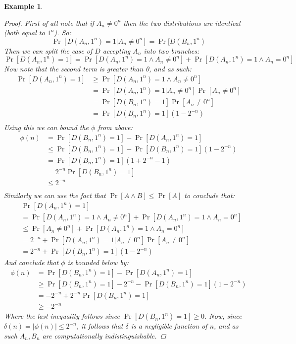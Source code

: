 \documentclass{article}
\newtheorem{example}{Example}
\begin{document}
\begin{example}
\begin{proof}
First of all note that if $A_n \neq 0^n$ then the two distributions are identical (both equal to $1^n$). So:
\[\Pr[D(A_n, 1^n) = 1 | A_n \neq 0^n] = \Pr[D(B_n, 1^n) \]
Then we can split the case of $D$ accepting $A_n$ into two branches:
\[ \Pr[D(A_n, 1^n) = 1] = \Pr[D(A_n, 1^n) = 1 \land A_n \neq 0^n] + \Pr[D(A_n, 1^n) = 1 \land A_n = 0^n]   \]
Now note that the second term is greater than 0, and as such:
\begin{align*}
    \Pr[D(A_n, 1^n) = 1] &\geq \Pr[D(A_n, 1^n) = 1 \land A_n \neq 0^n] \\
    &= \Pr[D(A_n, 1^n) = 1 | A_n \neq 0^n] \Pr[A_n \neq 0^n] \\
    &= \Pr[D(B_n, 1^n) = 1] \Pr[A_n \neq 0^n] \\
    &= \Pr[D(B_n, 1^n) = 1] (1 - 2^{-n}) \\
\end{align*}
Using this we can bound the $\phi$ from above: 
\begin{align*}
 \phi(n) &= \Pr[D(B_n, 1^n) = 1] - \Pr[D(A_n, 1^n) = 1] \\
 &\leq  \Pr[D(B_n, 1^n) = 1] - \Pr[D(B_n, 1^n) = 1] (1 - 2^{-n})  \\
 &= \Pr[D(B_n, 1^n) = 1] (1 + 2^{-n} - 1) \\
 &= 2^{-n} \Pr[D(B_n, 1^n) = 1] \\ 
 &\leq 2^{-n} \\
\end{align*}
Similarly we can use the fact that $\Pr[A \land B] \leq \Pr[A]$ to conclude that:
\begin{align*}
    &\Pr[D(A_n, 1^n) = 1] \\
    &= \Pr[D(A_n, 1^n) = 1 \land A_n \neq 0^n] + \Pr[D(A_n, 1^n) = 1 \land A_n = 0^n] \\
    &\leq \Pr[A_n \neq 0^n] + \Pr[D(A_n, 1^n) = 1 \land A_n = 0^n] \\
    &= 2^{-n} + \Pr[D(A_n, 1^n) = 1 | A_n \neq 0^n] \Pr[A_n \neq 0^n] \\
    &= 2^{-n} + \Pr[D(B_n, 1^n) = 1] (1 - 2^{-n}) 
\end{align*}
And conclude that $\phi$ is bounded below by:
\begin{align*}
    \phi(n) &=  \Pr[D(B_n, 1^n) = 1] - \Pr[D(A_n, 1^n) = 1] \\
    &\geq  \Pr[D(B_n, 1^n) = 1] - 2^{-n} - \Pr[D(B_n, 1^n) = 1] (1 - 2^{-n}) \\
    &=  - 2 ^ {-n} + 2^{-n} \Pr[D(B_n, 1^n) = 1] \\ 
    &\geq - 2^{-n} 
\end{align*}
Where the last inequality follows since $\Pr[D(B_n, 1^n) = 1] \geq 0$.
Now, since $\delta(n) = |\phi(n)| \leq  2 ^ {-n} $, it follows that $\delta$ is a negligible function of $n$, and as such $A_n, B_n$ are computationally indistinguishable. 

\end{proof}
\end{example}
\end{document}

